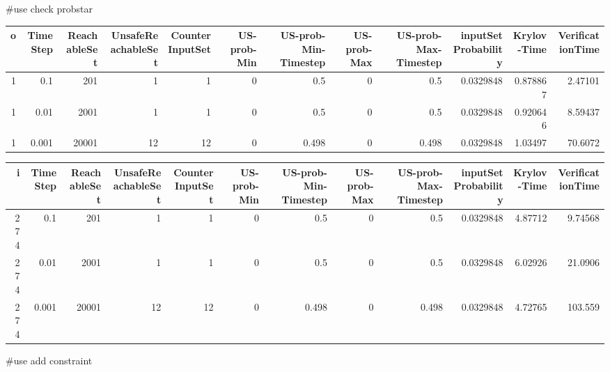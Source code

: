 
#use check probstar
\begin{tabular}{rrrrrrrrrrrr}
\hline
   o &   TimeStep &   ReachableSet &   UnsafeReachableSet &   CounterInputSet &   US-prob-Min &   US-prob-Min-Timestep &   US-prob-Max &   US-prob-Max-Timestep &   inputSet Probability &   Krylov-Time &   VerificationTime \\
\hline
   1 &      0.1   &            201 &                    1 &                 1 &             0 &                  0.5   &             0 &                  0.5   &              0.0329848 &      0.878867 &            2.47101 \\
   1 &      0.01  &           2001 &                    1 &                 1 &             0 &                  0.5   &             0 &                  0.5   &              0.0329848 &      0.920646 &            8.59437 \\
   1 &      0.001 &          20001 &                   12 &                12 &             0 &                  0.498 &             0 &                  0.498 &              0.0329848 &      1.03497  &           70.6072  \\
\hline
\end{tabular}
\begin{tabular}{rrrrrrrrrrrr}
\hline
   i &   TimeStep &   ReachableSet &   UnsafeReachableSet &   CounterInputSet &   US-prob-Min &   US-prob-Min-Timestep &   US-prob-Max &   US-prob-Max-Timestep &   inputSet Probability &   Krylov-Time &   VerificationTime \\
\hline
 274 &      0.1   &            201 &                    1 &                 1 &             0 &                  0.5   &             0 &                  0.5   &              0.0329848 &       4.87712 &            9.74568 \\
 274 &      0.01  &           2001 &                    1 &                 1 &             0 &                  0.5   &             0 &                  0.5   &              0.0329848 &       6.02926 &           21.0906  \\
 274 &      0.001 &          20001 &                   12 &                12 &             0 &                  0.498 &             0 &                  0.498 &              0.0329848 &       4.72765 &          103.559   \\
\hline
\end{tabular}

#use add constraint


